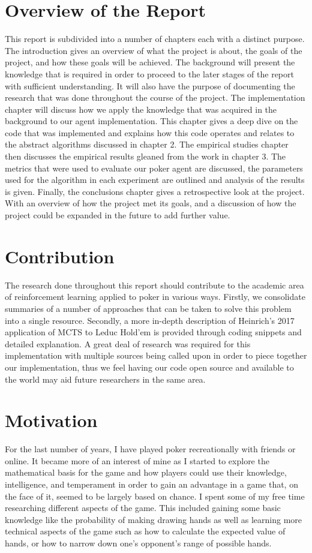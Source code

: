 \section{Overview of the Report}\label{sec:reportOverview}
This report is subdivided into a number of chapters each with a distinct purpose.
The introduction gives an overview of what the project is about, the goals of the project, and how
these goals will be achieved.
The background will present the knowledge that is required in order to proceed to the
later stages of the report with sufficient understanding.
It will also have the purpose of documenting the research that was done throughout the course of the project.
The implementation chapter will discuss how we apply the knowledge that was acquired in the
background to our agent implementation.
This chapter gives a deep dive on the code that was implemented and explains how this code operates
and relates to the abstract algorithms discussed in chapter 2.
The empirical studies chapter then discusses the empirical results gleaned from the work in chapter 3.
The metrics that were used to evaluate our poker agent are discussed, the parameters used for the algorithm
in each experiment are outlined and analysis of the results is given.
Finally, the conclusions chapter gives a retrospective look at the project.
With an overview of how the project met its goals, and a discussion of how the project could be
expanded in the future to add further value.

\section{Contribution}\label{sec:contribution}
The research done throughout this report should contribute to the academic area of reinforcement
learning applied to poker in various ways.
Firstly, we consolidate summaries of a number of approaches that can be taken to solve this problem into a single
resource.
Secondly, a more in-depth description of Heinrich's 2017 application of MCTS to Leduc Hold'em is
provided through coding snippets and detailed explanation.
A great deal of research was required for this implementation with multiple sources being called
upon in order to piece together our implementation, thus we feel having our code
open source and available to the world may aid future researchers in the same area.

\section{Motivation}\label{sec:Motivation}
For the last number of years, I have played poker recreationally with friends or online.
It became more of an interest of mine as I started to explore the mathematical basis for the game and how
players could use their knowledge, intelligence, and temperament in order to gain an advantage in a game that,
on the face of it, seemed to be largely based on chance.
I spent some of my free time researching different aspects of the game.
This included gaining some basic knowledge like the probability of making drawing hands as well as learning more
technical aspects of the game such as how to calculate the expected value of hands,
or how to narrow down one's opponent's range of possible hands.

